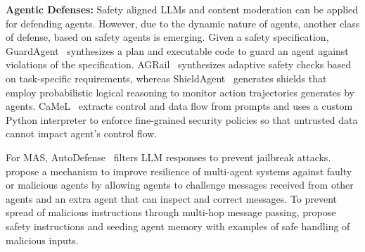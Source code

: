    \textbf{Agentic Defenses:}
    Safety aligned LLMs and content moderation can be applied for defending agents. However, due to the dynamic nature of agents, another class of defense, based on safety agents is emerging. Given a safety specification, GuardAgent~\citep{xiang2024guardagent} synthesizes a plan and executable code to guard an agent against violations of the specification. AGRail~\citep{luo2025agrail} synthesizes adaptive safety checks based on task-specific requirements, whereas ShieldAgent~\citep{chen2025shieldagent} generates shields that employ probabilistic logical reasoning to monitor action trajectories generates by agents. CaMeL~\citep{debenedetti2025defeating} extracts control and data flow from prompts and uses a custom Python interpreter to enforce fine-grained security policies so that untrusted data cannot impact agent's control flow.
    
    For MAS, AutoDefense~\citep{zeng2024autodefense} filters LLM responses to prevent jailbreak attacks.
    \citet{huang2024resilience} propose a mechanism to improve resilience of multi-agent systems against faulty or malicious agents by allowing agents to challenge messages received from other agents and an extra agent that can inspect and correct messages. To prevent spread of malicious instructions through multi-hop message passing, \citet{peigne2025multi} propose safety instructions and seeding agent memory with examples of safe handling of malicious inputs.
    